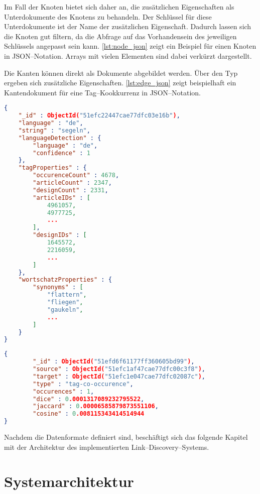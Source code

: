 Im Fall der Knoten bietet sich daher an, die zusätzlichen Eigenschaften als Unterdokumente des Knotens zu behandeln. Der Schlüssel für diese Unterdokumente ist der Name der zusätzlichen Eigenschaft. Dadurch lassen sich die Knoten gut filtern, da die Abfrage auf das Vorhandensein des jeweiligen Schlüssels angepasst sein kann. \cref{lst:node_json} zeigt ein Beispiel für einen Knoten in JSON--Notation. Arrays mit vielen Elementen sind dabei verkürzt dargestellt.

Die Kanten können direkt als Dokumente abgebildet werden. Über den Typ ergeben sich zusätzliche Eigenschaften. \cref{lst:edge_json} zeigt beispielhaft ein Kantendokument für eine Tag--Kookkurrenz in JSON--Notation.

\begin{lstlisting}[language=json, label={lst:node_json}, caption={Knotendokument in JSON}]
{
    "_id" : ObjectId("51efc22447cae77dfc03e16b"),
    "language" : "de",
    "string" : "segeln",
    "languageDetection" : {
        "language" : "de",
        "confidence" : 1
    },
    "tagProperties" : {
        "occurenceCount" : 4678,
        "articleCount" : 2347,
        "designCount" : 2331,
        "articleIDs" : [ 
            4961057, 
            4977725, 
            ...
        ],
        "designIDs" : [ 
            1645572, 
            2216059, 
            ...
        ]
    },
    "wortschatzProperties" : {
        "synonyms" : [ 
            "flattern", 
            "fliegen", 
            "gaukeln", 
            ...
        ]
    }
}
\end{lstlisting}

\begin{lstlisting}[language=json, label={lst:edge_json}, caption={Kantendokument in JSON}]
{
        "_id" : ObjectId("51efd6f61177ff360605bd99"),
        "source" : ObjectId("51efc1af47cae77dfc00c3f8"),
        "target" : ObjectId("51efc1e047cae77dfc02087c"),
        "type" : "tag-co-occurence",
        "occurences" : 1,
        "dice" : 0.0001317089232795522,
        "jaccard" : 0.00006585879873551106,
        "cosine" : 0.008115343414514944
}
\end{lstlisting}

Nachdem die Datenformate definiert sind, beschäftigt sich das folgende Kapitel mit der Architektur des implementierten Link--Discovery--Systems.

\section{Systemarchitektur}

